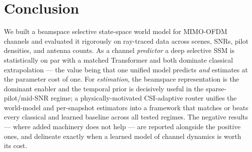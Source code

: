 \documentclass[11pt]{article}
\begin{document}
\section{Conclusion}\label{sec:conclusion}

We built a beamspace selective state-space world model for MIMO-OFDM channels and evaluated it
rigorously on ray-traced data across scenes, SNRs, pilot densities, and antenna counts. As a channel
\emph{predictor} a deep selective SSM is statistically on par with a matched Transformer and both
dominate classical extrapolation --- the value being that one unified model predicts \emph{and}
estimates at the parameter cost of one. For
\emph{estimation}, the beamspace representation is the dominant enabler and the temporal prior is
decisively useful in the sparse-pilot/mid-SNR regime; a physically-motivated CSI-adaptive router
unifies the world-model and per-snapshot estimators into a framework that matches or beats every
classical and learned baseline across all tested regimes. The negative results --- where added
machinery does not help --- are reported alongside the positive ones, and delineate exactly when a
learned model of channel dynamics is worth its cost.
\end{document}
